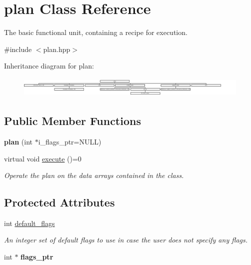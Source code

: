 \hypertarget{classplan}{\section{plan Class Reference}
\label{classplan}
}


The basic functional unit, containing a recipe for execution.  




{\ttfamily \#include $<$plan.\-hpp$>$}

Inheritance diagram for plan\-:\begin{figure}[H]
\begin{center}
\leavevmode
\includegraphics[height=0.984615cm]{classplan}
\end{center}
\end{figure}
\subsection*{Public Member Functions}
\begin{DoxyCompactItemize}
\item 
\hypertarget{classplan_a4ff4748cc49289ca936d719e89487123}{{\bfseries plan} (int $\ast$i\-\_\-flags\-\_\-ptr=N\-U\-L\-L)}\label{classplan_a4ff4748cc49289ca936d719e89487123}

\item 
virtual void \hyperlink{classplan_a2aaf5789c18317995b2eaf168e839fb5}{execute} ()=0
\begin{DoxyCompactList}\small\item\em Operate the plan on the data arrays contained in the class. \end{DoxyCompactList}\end{DoxyCompactItemize}
\subsection*{Protected Attributes}
\begin{DoxyCompactItemize}
\item 
\hypertarget{classplan_a14f8cce3065ed97f0909eda7b62ca1dc}{int \hyperlink{classplan_a14f8cce3065ed97f0909eda7b62ca1dc}{default\-\_\-flags}}\label{classplan_a14f8cce3065ed97f0909eda7b62ca1dc}

\begin{DoxyCompactList}\small\item\em An integer set of default flags to use in case the user does not specify any flags. \end{DoxyCompactList}\item 
\hypertarget{classplan_ada18dc9e93c6833cd8c0d228598e20db}{int $\ast$ {\bfseries flags\-\_\-ptr}}\label{classplan_ada18dc9e93c6833cd8c0d228598e20db}

\end{DoxyCompactItemize}



